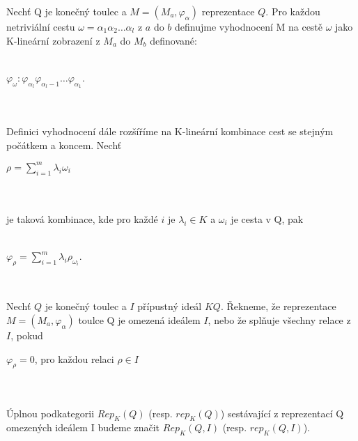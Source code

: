     \begin{dfn}
      Nechť Q je konečný toulec a $M=(M_a,\varphi_\alpha)$ reprezentace $Q$.  Pro 
      každou netriviální cestu $\omega=\alpha_1\alpha_2\ldots\alpha_l$ z $a$ do $b$ 
      definujme vyhodnocení M na cestě $\omega$ jako K-lineární zobrazení z $M_a$ 
      do $M_b$ definované: \\\\
      \centerline{$\varphi_\omega:\varphi_{\alpha_l}\varphi_{\alpha_l-1}\ldots\varphi_{\alpha_1}$.} 
      \\\\
      Definici vyhodnocení dále rozšíříme na K-lineární kombinace cest se 
      stejným počátkem a koncem. Nechť \\
      \centerline{$\rho=\sum_{i=1}^m\lambda_i\omega_i$} 
      \\\\
      je taková kombinace, kde pro každé $i$ je $\lambda_i\in K$ a $\omega_i$ je cesta v 
      Q, pak \\\\
      \centerline{$\varphi_\rho=\sum_{i=1}^m\lambda_i\rho_{\omega_i}$.}\\
    \end{dfn}
    
    \begin{dfn}
      Nechť  $Q$ je konečný toulec a $I$ přípustný ideál $KQ$. Řekneme, že reprezentace 
      $M=(M_a,\varphi_\alpha)$ toulce Q je omezená ideálem $I$, nebo že splňuje všechny relace 
      z $I$, pokud \\
      \centerline{$\varphi_\rho=0$, pro každou relaci $\rho\in I$}\\\\ 
      Úplnou podkategorii $Rep_K(Q)$ (resp. $rep_K(Q)$) sestávající z 
      reprezentací Q omezených ideálem I budeme značit $Rep_K(Q,I)$ (resp. 
      $rep_K(Q,I)$).    
    \end{dfn}
    
